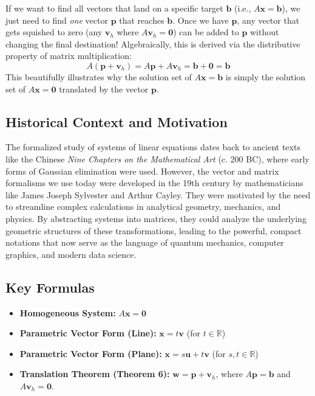 \documentclass[11pt]{article}
\begin{document}
If we want to find all vectors that land on a specific target $\mathbf{b}$ (i.e., $A\mathbf{x} = \mathbf{b}$), we just need to find \textit{one} vector $\mathbf{p}$ that reaches $\mathbf{b}$. Once we have $\mathbf{p}$, any vector that gets squished to zero (any $\mathbf{v}_h$ where $A\mathbf{v}_h = \mathbf{0}$) can be added to $\mathbf{p}$ without changing the final destination! Algebraically, this is derived via the distributive property of matrix multiplication:
\[ A(\mathbf{p} + \mathbf{v}_h) = A\mathbf{p} + A\mathbf{v}_h = \mathbf{b} + \mathbf{0} = \mathbf{b} \]
This beautifully illustrates why the solution set of $A\mathbf{x} = \mathbf{b}$ is simply the solution set of $A\mathbf{x} = \mathbf{0}$ translated by the vector $\mathbf{p}$.

\subsection{Historical Context and Motivation}
The formalized study of systems of linear equations dates back to ancient texts like the Chinese \textit{Nine Chapters on the Mathematical Art} (c. 200 BC), where early forms of Gaussian elimination were used. However, the vector and matrix formalisms we use today were developed in the 19th century by mathematicians like James Joseph Sylvester and Arthur Cayley. They were motivated by the need to streamline complex calculations in analytical geometry, mechanics, and physics. By abstracting systems into matrices, they could analyze the underlying geometric structures of these transformations, leading to the powerful, compact notations that now serve as the language of quantum mechanics, computer graphics, and modern data science.

\subsection{Key Formulas}
\begin{itemize}
    \item \textbf{Homogeneous System:} $A\mathbf{x} = \mathbf{0}$
    \item \textbf{Parametric Vector Form (Line):} $\mathbf{x} = t\mathbf{v}$ (for $t \in \mathbb{R}$)
    \item \textbf{Parametric Vector Form (Plane):} $\mathbf{x} = s\mathbf{u} + t\mathbf{v}$ (for $s, t \in \mathbb{R}$)
    \item \textbf{Translation Theorem (Theorem 6):} $\mathbf{w} = \mathbf{p} + \mathbf{v}_h$, where $A\mathbf{p} = \mathbf{b}$ and $A\mathbf{v}_h = \mathbf{0}$.
\end{itemize}
\end{document}
